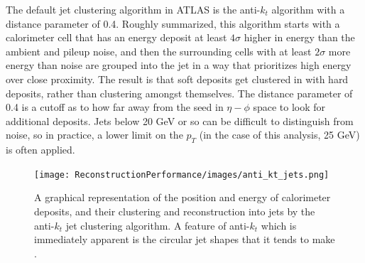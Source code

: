The default jet clustering algorithm in ATLAS is the anti-$k_t$ algorithm \cite{antikt}
with a distance parameter of 0.4.  Roughly summarized, this algorithm starts with a calorimeter cell that 
has an energy deposit at least $4\sigma$ higher in energy than the ambient and pileup noise, 
and then the surrounding cells with at least $2\sigma$ more energy than noise are grouped into 
the jet in a way that prioritizes high energy over close proximity.  The result is that soft deposits get 
clustered in with hard deposits, rather than clustering amongst themselves.  The distance parameter of 0.4 is 
a cutoff as to how far away from the seed in $\eta-\phi$ space to look for 
additional deposits.   Jets below 20 GeV or so can be difficult to distinguish from noise, so in practice, a lower limit on 
the $p_T$ (in the case of this analysis, 25 GeV) is often applied.  


\begin{figure}
    \center
	\texttt{[image: ReconstructionPerformance/images/anti\_kt\_jets.png]}
	\caption{A graphical representation of the position and energy of calorimeter deposits, and their clustering and reconstruction into jets by the anti-$k_t$ jet clustering algorithm.  A feature of anti-$k_t$ which is immediately apparent is the circular jet shapes that it tends to make \cite{antikt}.  \label{fig:anti_kt_jets}  }
\end{figure}








